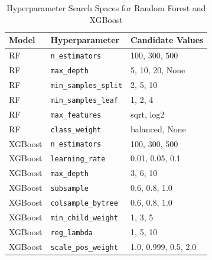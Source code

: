 \begin{table}[!htbp]
\centering
\caption{Hyperparameter Search Spaces for Random Forest and XGBoost}
\label{tab:search_space}
\footnotesize
\begin{tabularx}{\linewidth}{l l X}
\toprule
\textbf{Model} & \textbf{Hyperparameter} & \textbf{Candidate Values} \\
\midrule
RF & \texttt{n\_estimators} & 100, 300, 500 \\
RF & \texttt{max\_depth} & 5, 10, 20, None \\
RF & \texttt{min\_samples\_split} & 2, 5, 10 \\
RF & \texttt{min\_samples\_leaf} & 1, 2, 4 \\
RF & \texttt{max\_features} & sqrt, log2 \\
RF & \texttt{class\_weight} & balanced, None \\
\midrule
XGBoost & \texttt{n\_estimators} & 100, 300, 500 \\
XGBoost & \texttt{learning\_rate} & 0.01, 0.05, 0.1 \\
XGBoost & \texttt{max\_depth} & 3, 6, 10 \\
XGBoost & \texttt{subsample} & 0.6, 0.8, 1.0 \\
XGBoost & \texttt{colsample\_bytree} & 0.6, 0.8, 1.0 \\
XGBoost & \texttt{min\_child\_weight} & 1, 3, 5 \\
XGBoost & \texttt{reg\_lambda} & 1, 5, 10 \\
XGBoost & \texttt{scale\_pos\_weight} & 1.0, 0.999, 0.5, 2.0 \\
\bottomrule
\end{tabularx}
\end{table}